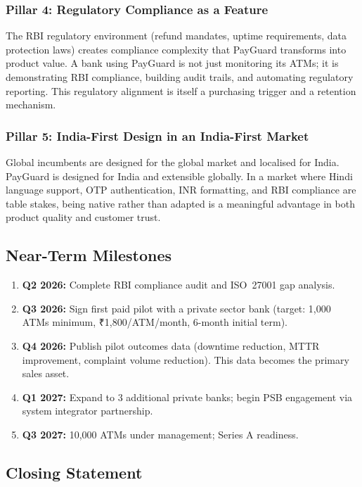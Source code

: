 \documentclass[12pt,a4paper]{article}
\newcommand{\inr}{₹}
\begin{document}
\subsubsection{Pillar 4: Regulatory Compliance as a Feature}

The RBI regulatory environment (refund mandates, uptime requirements, data protection laws)
creates compliance complexity that PayGuard transforms into product value. A bank using
PayGuard is not just monitoring its ATMs; it is demonstrating RBI compliance, building audit
trails, and automating regulatory reporting. This regulatory alignment is itself a purchasing
trigger and a retention mechanism.

\subsubsection{Pillar 5: India-First Design in an India-First Market}

Global incumbents are designed for the global market and localised for India. PayGuard is
designed for India and extensible globally. In a market where Hindi language support, OTP
authentication, INR formatting, and RBI compliance are table stakes, being native rather than
adapted is a meaningful advantage in both product quality and customer trust.

\subsection{Near-Term Milestones}

\begin{enumerate}
  \item \textbf{Q2 2026:} Complete RBI compliance audit and ISO~27001 gap analysis.
  \item \textbf{Q3 2026:} Sign first paid pilot with a private sector bank (target: 1,000
        ATMs minimum, \inr{}1,800/ATM/month, 6-month initial term).
  \item \textbf{Q4 2026:} Publish pilot outcomes data (downtime reduction, MTTR improvement,
        complaint volume reduction). This data becomes the primary sales asset.
  \item \textbf{Q1 2027:} Expand to 3 additional private banks; begin PSB engagement via
        system integrator partnership.
  \item \textbf{Q3 2027:} 10,000 ATMs under management; Series A readiness.
\end{enumerate}

\subsection{Closing Statement}
\end{document}
